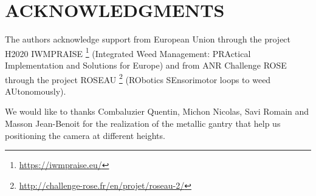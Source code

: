 \documentclass[a4paper,twoside]{article}
\begin{document}
	\section*{\uppercase{Acknowledgments}}
	
	\par The authors acknowledge support from European Union through the project H2020 IWMPRAISE \footnote{\url{https://iwmpraise.eu/}}
	(Integrated Weed Management: PRActical Implementation and Solutions for Europe)
	and from ANR Challenge ROSE through the project ROSEAU \footnote{\url{http://challenge-rose.fr/en/projet/roseau-2/}} (RObotics SEnsorimotor loops to weed AUtonomously).
	\\
	\par We would like to thanks Combaluzier Quentin, Michon Nicolas, Savi Romain and Masson Jean-Benoit
	for the realization of the metallic gantry that help us positioning the camera at different heights.
	
	
	
	{\small }
	
	
\end{document}
